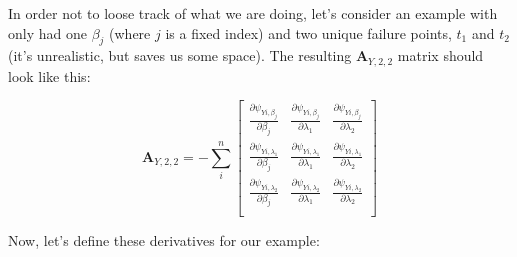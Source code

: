 \documentclass[]{article}
\begin{document}
In order not to loose track of what we are doing, let's consider an example with only had one $\beta_j$ (where $j$ is a fixed index) and two unique failure points, $t_1$ and $t_2$ (it's unrealistic, but saves us some space). The resulting $\pmb{A}_{Y,2,2}$ matrix should look like this: 

  \[
  \pmb{A}_{Y,2,2} = -\sum_i^n\begin{bmatrix}
      \frac{\partial \psi_{Yi,\beta_j}}{ \partial \beta_j} &
      \frac{\partial \psi_{Yi,\beta_j}}{ \partial \lambda_1} &
      \frac{\partial \psi_{Yi,\beta_j}}{ \partial \lambda_2} \\
      \frac{\partial \psi_{Yi,\lambda_1}}{ \partial \beta_j} &
      \frac{\partial \psi_{Yi,\lambda_1}}{ \partial \lambda_1} &
      \frac{\partial \psi_{Yi,\lambda_1}}{ \partial \lambda_2} \\
      \frac{\partial \psi_{Yi,\lambda_2}}{ \partial \beta_j} &
      \frac{\partial \psi_{Yi,\lambda_2}}{ \partial \lambda_1} &
      \frac{\partial \psi_{Yi,\lambda_2}}{ \partial \lambda_2}\\
  \end{bmatrix}
  \]

Now, let's define these derivatives for our example:
\end{document}
